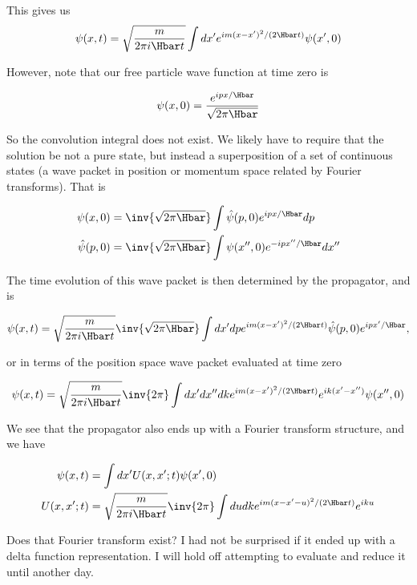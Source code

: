 {This gives us
\begin{equation}\label{eqn:qmIexamPractice2007Dec:1f:40}
\psi(x, t)
=
\sqrt{\frac{m}{2 \pi i \Hbar t}}
\int dx'
e^{i m (x-x')^2/ (2 \Hbar t)} \psi(x', 0)
\end{equation}

However, note that our free particle wave function at time zero is

\begin{equation}\label{eqn:qmIexamPractice2007Dec:1f:50}
\psi(x, 0) = \frac{e^{i p x/\Hbar}}{\sqrt{2 \pi \Hbar}}
\end{equation}

So the convolution integral  does not exist.  We likely have to require that the solution be not a pure state, but instead a superposition of a set of continuous states (a wave packet in position or momentum space related by Fourier transforms).  That is

\begin{equation}\label{eqn:qmIexamPractice2007Dec:1f:60}
\begin{aligned}
\psi(x, 0) &=
\inv{\sqrt{2 \pi \Hbar}} \int \hat{\psi}(p, 0) e^{i p x/\Hbar} dp \\
\hat{\psi}(p, 0) &=
\inv{\sqrt{2 \pi \Hbar}} \int \psi(x'', 0) e^{-i p x''/\Hbar} dx''
\end{aligned}
\end{equation}

The time evolution of this wave packet is then determined by the propagator, and is

\begin{equation}\label{eqn:qmIexamPractice2007Dec:1f:70}
\psi(x,t) =
\sqrt{\frac{m}{2 \pi i \Hbar t}}
\inv{\sqrt{2 \pi \Hbar}}
\int dx' dp
e^{i m (x-x')^2/ (2 \Hbar t)}
\hat{\psi}(p, 0) e^{i p x'/\Hbar} ,
\end{equation}

or in terms of the position space wave packet evaluated at time zero

\begin{equation}\label{eqn:qmIexamPractice2007Dec:1f:80}
\psi(x,t) =
\sqrt{\frac{m}{2 \pi i \Hbar t}}
\inv{2 \pi}
\int dx' dx'' dk
e^{i m (x-x')^2/ (2 \Hbar t)}
e^{i k (x' - x'')} \psi(x'', 0)
\end{equation}

We see that the propagator also ends up with a Fourier transform structure, and we have

\begin{equation}\label{eqn:qmIexamPractice2007Dec:1f:90}
\begin{aligned}
\psi(x,t) &= \int dx' U(x, x' ; t) \psi(x', 0) \\
U(x, x' ; t) &=
\sqrt{\frac{m}{2 \pi i \Hbar t}}
\inv{2 \pi}
\int du dk
e^{i m (x - x' - u)^2/ (2 \Hbar t)}
e^{i k u }
\end{aligned}
\end{equation}

Does that Fourier transform exist?  I had not be surprised if it ended up with a delta function representation.  I will hold off attempting to evaluate and reduce it until another day.

} %
